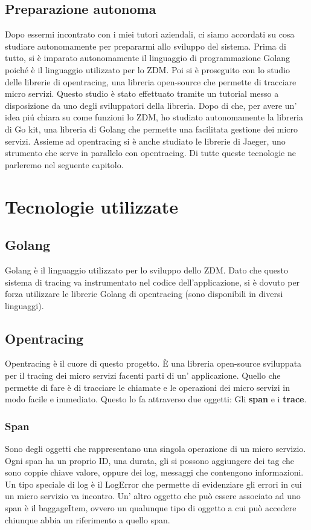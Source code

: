 \documentclass[a4paper,12pt,titlepage,italian,openany]{report}
\begin{document}
\section{Preparazione autonoma}
Dopo essermi incontrato con i miei tutori aziendali, ci siamo accordati su cosa studiare autonomamente per prepararmi allo sviluppo del sistema.
Prima di tutto, si è imparato autonomamente il linguaggio di programmazione Golang poiché è il linguaggio utilizzato per lo ZDM\cite{zdm:1}.
Poi si è proseguito con lo studio delle librerie di opentracing, una libreria open-source che permette di tracciare micro servizi.
Questo studio è stato effettuato tramite un tutorial\cite{opentracing:2} messo a disposizione da uno degli sviluppatori della libreria. Dopo di che, per avere un' idea piú chiara su come funzioni lo ZDM,
ho studiato autonomamente la libreria di Go kit\cite{go:2}, una libreria di Golang che permette una facilitata gestione dei micro servizi.
Assieme ad opentracing si è anche studiato le librerie di Jaeger\cite{jaeger:1}, uno strumento che serve in parallelo con opentracing.
Di tutte queste tecnologie ne parleremo nel seguente capitolo.
\chapter{Tecnologie utilizzate}
\section{Golang}
Golang\cite{go:1} è il linguaggio utilizzato per lo sviluppo dello ZDM. Dato che questo sistema di tracing va instrumentato nel codice dell'applicazione, si è dovuto per forza utilizzare le librerie
Golang di opentracing (sono disponibili in diversi linguaggi).
\section{Opentracing}
Opentracing\cite{opentracing:1} è il cuore di questo progetto. È una libreria open-source sviluppata per il tracing dei micro servizi facenti parti di un' applicazione.
Quello che permette di fare è di tracciare le chiamate e le operazioni dei micro servizi in modo facile e immediato.
Questo lo fa attraverso due oggetti: Gli \textbf{span} e i \textbf{trace}.\\
\subsection{Span}
Sono degli oggetti che rappresentano una singola operazione di un micro servizio. Ogni span ha un proprio ID, una durata, 
gli si possono aggiungere dei tag che sono coppie chiave valore, oppure dei log, messaggi che contengono informazioni. Un tipo speciale di log è il LogError che permette
di evidenziare gli errori in cui un micro servizio va incontro. Un' altro oggetto che può essere associato ad uno span è il baggageItem, ovvero un qualunque tipo di oggetto a cui può accedere chiunque abbia un riferimento a quello span.
\end{document}
